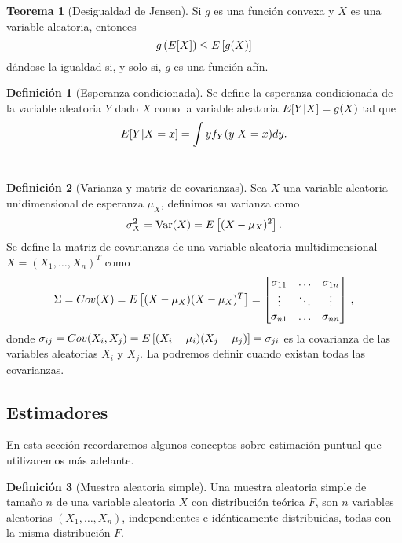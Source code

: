\documentclass[12pt,a4paper]{report} %
\let\mathbb\relax
\newcommand{\Var}{\text{Var}}
\theoremstyle{definition}
\newtheorem{definition}{Definición}[section]
\newtheorem{theorem}{Teorema}[section]
\begin{document}
\begin{theorem}[Desigualdad de Jensen]\label{th:jensen}
  Si $g$ es una función convexa y $X$ es una variable aleatoria, entonces\[
 g\left ( \E[X] \right) \leq \E\left[g(X)\right]
  \]
dándose la igualdad si, y solo si, $g$ es una función afín.\\
\end{theorem}

\begin{definition}[Esperanza condicionada]
  Se define la esperanza condicionada de la variable aleatoria $Y$ dado $X$ como la variable aleatoria $\mathbb{E}[Y|X] = g(X)$ tal que \[
\mathbb{E} [ Y | X = x ] = \int y f_Y(y| X = x) dy.
  \] \\[-10pt]
  
\end{definition}
\begin{definition}[Varianza y matriz de covarianzas]
  Sea $X$ una variable aleatoria unidimensional de esperanza $\mu_X$, definimos su varianza como\[
\sigma_X^2 = \Var(X) = \mathbb{E}\left [ (X- \mu_X)^2 \right ].
  \]
  Se define la matriz de covarianzas de una variable aleatoria multidimensional $X= (X_1,\dots,X_n)^T$ como\[
\Sigma = Cov(X) = \mathbb{E}\left [(X-\mu_X)(X-\mu_X)^T \right ] =  \begin{bmatrix} \sigma_{11} & \dots & \sigma_{1n} \\ \vdots& \ddots & \vdots \\ \sigma_{n1} &  \dots & \sigma_{nn}\end{bmatrix}\,,
\]
donde $\sigma_{ij} = Cov(X_i, X_j) = \mathbb{E}\left[(X_i-\mu_i)(X_j-\mu_j)\right]=\sigma_{ji}$ es la covarianza de las variables aleatorias $X_i$ y $X_j$. La podremos definir cuando existan todas las covarianzas.\\ 
\end{definition}

\subsection{Estimadores}

En esta sección recordaremos algunos conceptos sobre estimación puntual que utilizaremos más adelante.\\

\begin{definition}[Muestra aleatoria simple]
  Una muestra aleatoria simple de tamaño $n$ de una variable aleatoria $X$ con distribución teórica $F$, son $n$ variables aleatorias $(X_1,\dots,X_n)$, independientes e idénticamente distribuidas, todas con la misma distribución $F$.\\
\end{definition}
\end{document}
